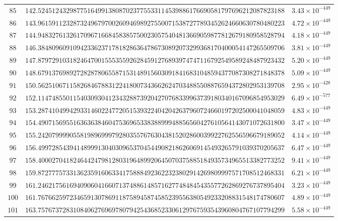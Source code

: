 \documentclass[12pt,reqno]{amsart}
\theoremstyle{plain}
\theoremstyle{definition}
\theoremstyle{remark}
\begin{document}
\begin{longtable}{clc}
$85$ & $142.5245124329877516499138087023775533114539886176690581797696212087823188$ & $3.43 \times 10^{-449}$ \\
$86$ & $143.9615911232873249679700260946989275500715387277893452624660630780480223$ & $4.72 \times 10^{-449}$ \\
$87$ & $144.9483276132617096716684583857500230575404813669059877812679180958528794$ & $4.18 \times 10^{-449}$ \\
$88$ & $146.3848096091094233623717818286364786730892073299368170400054147265509706$ & $3.81 \times 10^{-449}$ \\
$89$ & $147.8797291031824647001555355926284591276893974747116792549589248487923432$ & $5.20 \times 10^{-449}$ \\
$90$ & $148.6791376989272828780655871531489156030918416831048594377087308271848378$ & $5.09 \times 10^{-449}$ \\
$91$ & $150.5625106711582684678831224180073436626247034885508876594372802953139708$ & $2.95 \times 10^{-428}$ \\
$92$ & $152.1147485501154030930412343288739204270768339963739180340167096854953029$ & $6.49 \times 10^{-577}$ \\
$93$ & $153.2874104994293314602247720515393224042042637960724660197202500041048059$ & $4.83 \times 10^{-449}$ \\
$94$ & $154.4907156955163636384604753696533838899948856560427610564143071072631800$ & $3.47 \times 10^{-449}$ \\
$95$ & $155.2420799990558198969997928035576763043815202860039922762556596679189052$ & $4.14 \times 10^{-449}$ \\
$96$ & $156.4997285439414899913040309653704544908218626069145493265791039370205637$ & $6.47 \times 10^{-449}$ \\
$97$ & $158.4000270418246442479812803196489920645070375885184935734965513382773252$ & $9.41 \times 10^{-449}$ \\
$98$ & $159.8727775733136235916063341758884923622323802914269809997571708512468331$ & $6.21 \times 10^{-449}$ \\
$99$ & $161.2462175616940906041660713748861485716277484845435577262869276737895404$ & $3.23 \times 10^{-449}$ \\
$100$ & $161.7676625972346591307869118758945874585239556380549233208831548174780607$ & $4.89 \times 10^{-449}$ \\
$101$ & $163.7576737283108406276969780794254368523306129767593543960804767107794299$ & $5.58 \times 10^{-449}$ \\

\end{longtable}
\end{document}
